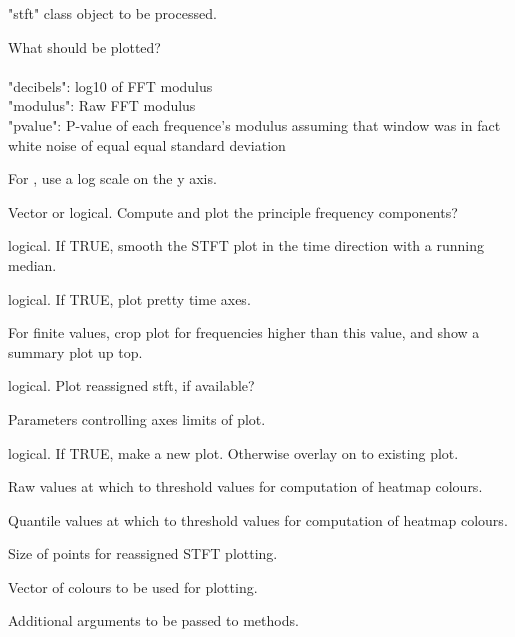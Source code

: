 \documentclass[a4paper]{book}
\begin{document}
\begin{Arguments}
\begin{ldescription}
\item[\code{x}] "stft" class object to be processed.
\item[\code{mode}] What should be plotted?\\{}\\{}
"decibels": log10 of FFT modulus\\{}
"modulus": Raw FFT modulus\\{}
"pvalue": P-value of each frequence's modulus assuming that window was in fact white noise of equal equal standard deviation
\item[\code{log}] For , use a log scale on the y axis.
\item[\code{showmax}] Vector or logical. Compute and plot the principle frequency components?
\item[\code{median}] logical. If TRUE, smooth the STFT plot in the time direction with a running median.
\item[\code{xaxis}] logical. If TRUE, plot pretty time axes.
\item[\code{topthresh}] For finite values, crop plot for frequencies higher than this value, and show a summary plot up top.
\item[\code{reassign}] logical. Plot reassigned stft, if available?
\item[\code{xlim, ylim}] Parameters controlling axes limits of plot.
\item[\code{new}] logical. If TRUE, make a new plot. Otherwise overlay on to existing plot.
\item[\code{zlim.raw}] Raw values at which to threshold values for computation of heatmap colours.
\item[\code{zlim.quantile}] Quantile values at which to threshold values for computation of heatmap colours.
\item[\code{cex}] Size of points for reassigned STFT plotting.
\item[\code{col}] Vector of colours to be used for plotting.
\item[\code{...}] Additional arguments to be passed to methods.
\end{ldescription}
\end{Arguments}
%
\end{document}
